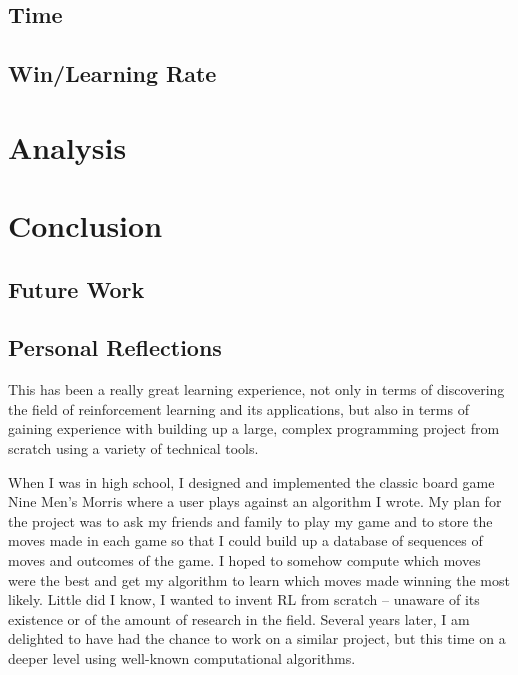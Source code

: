 \documentclass[11pt,a4paper]{report}
\begin{document}
\section{Time}


\section{Win/Learning Rate}



\chapter{Analysis} %



\chapter{Conclusion}


\section{Future Work}


\section{Personal Reflections}

This has been a really great learning experience, not only in terms of discovering the field of reinforcement learning and its applications, but also in terms of gaining experience with building up a large, complex programming project from scratch using a variety of technical tools.

When I was in high school, I designed and implemented the classic board game Nine Men’s Morris where a user plays against an algorithm I wrote. My plan for the project was to ask my friends and family to play my game and to store the moves made in each game so that I could build up a database of sequences of moves and outcomes of the game. I hoped to somehow compute which moves were the best and get my algorithm to learn which moves made winning the most likely. Little did I know, I wanted to invent RL from scratch – unaware of its existence or of the amount of research in the field. Several years later, I am delighted to have had the chance to work on a similar project, but this time on a deeper level using well-known computational algorithms.
\end{document}
